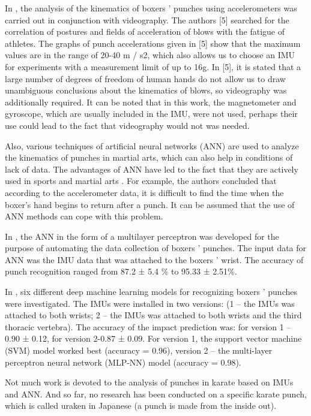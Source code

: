 \documentclass[sport,article,submit,moreauthors,pdftex]{Definitions/mdpi}
\begin{document}
In \cite{ref-journal5}, the analysis of the kinematics of boxers ' punches using accelerometers was carried out in conjunction with videography. The authors [5] searched for the correlation of postures and fields of acceleration of blows with the fatigue of athletes. The graphs of punch accelerations given in [5] show that the maximum values are in the range of 20-40 m / s2, which also allows us to choose an IMU for experiments with a measurement limit of up to 16g. In [5], it is stated that a large number of degrees of freedom of human hands do not allow us to draw unambiguous conclusions about the kinematics of blows, so videography was additionally required. It can be noted that in this work, the magnetometer and gyroscope, which are usually included in the IMU, were not used, perhaps their use could lead to the fact that videography would not was needed.

Also, various techniques of artificial neural networks (ANN) are used to analyze the kinematics of punches in martial arts, which can also help in conditions of lack of data. The advantages of ANN have led to the fact that they are actively used in sports and martial arts \cite{ref-journal6}. For example, the authors \cite{ref-journal3} concluded that according to the accelerometer data, it is difficult to find the time when the boxer's hand begins to return after a punch. It can be assumed that the use of ANN methods can cope with this problem.

In \cite{ref-journal7}, the ANN in the form of a multilayer perceptron was developed for the purpose of automating the data collection of boxers ' punches. The input data for ANN was the IMU data that was attached to the boxers ' wrist. The accuracy of punch recognition ranged from 87.2 ± 5.4 \% to 95.33 ± 2.51\%.

In \cite{ref-journal8}, six different deep machine learning models for recognizing boxers ' punches were investigated. The IMUs were installed in two versions: (1 – the IMUs was attached to both wrists; 2 – the IMUs was attached to both wrists and the third thoracic vertebra). The accuracy of the impact prediction was: for version 1 – 0.90 ± 0.12, for version 2-0.87 ± 0.09. For version 1, the support vector machine (SVM) model worked best (accuracy = 0.96), version 2 – the multi-layer perceptron neural network (MLP-NN) model (accuracy = 0.98).

Not much work is devoted to the analysis of punches in karate based on IMUs and ANN. And so far, no research has been conducted on a specific karate punch, which is called uraken in Japanese (a punch is made from the inside out).
\end{document}
